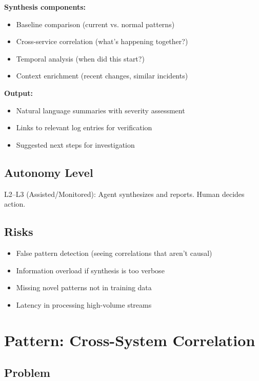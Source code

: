 \textbf{Synthesis components:}
\begin{itemize}
    \item Baseline comparison (current vs. normal patterns)
    \item Cross-service correlation (what's happening together?)
    \item Temporal analysis (when did this start?)
    \item Context enrichment (recent changes, similar incidents)
\end{itemize}

\textbf{Output:}
\begin{itemize}
    \item Natural language summaries with severity assessment
    \item Links to relevant log entries for verification
    \item Suggested next steps for investigation
\end{itemize}

\subsection{Autonomy Level}

L2--L3 (Assisted/Monitored): Agent synthesizes and reports. Human decides action.

\subsection{Risks}

\begin{itemize}
    \item False pattern detection (seeing correlations that aren't causal)
    \item Information overload if synthesis is too verbose
    \item Missing novel patterns not in training data
    \item Latency in processing high-volume streams
\end{itemize}

\section{Pattern: Cross-System Correlation}
\label{sec:cross-system-correlation}

\subsection{Problem}

